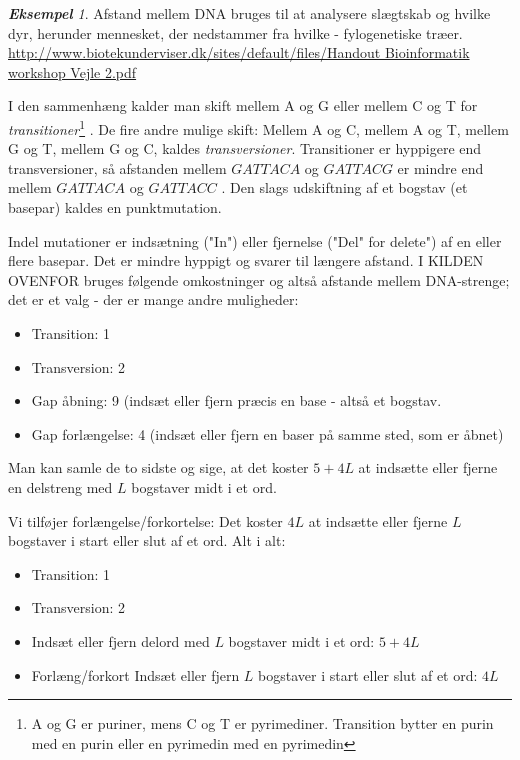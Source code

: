 \documentclass[a4paper, 12pt]{article}
\theoremstyle{remark}
\newtheorem{Eksempel}{\textbf{Eksempel}}
\begin{document}
\begin{Eksempel}
Afstand mellem DNA bruges til at analysere slægtskab og hvilke dyr, herunder mennesket, der nedstammer fra hvilke - fylogenetiske træer.\\ \url{ http://www.biotekunderviser.dk/sites/default/files/Handout Bioinformatik workshop Vejle 2.pdf}

I den sammenhæng kalder man skift mellem A og G eller mellem C og T for \emph{transitioner}\footnote{A og G er puriner, mens C og T er pyrimediner. Transition bytter en purin med en purin eller en pyrimedin med en pyrimedin} . De fire andre mulige skift: Mellem A og C, mellem A og T, mellem G og T, mellem G og C, kaldes \emph{transversioner}. Transitioner er hyppigere end transversioner, så afstanden mellem $GATTACA$ og $GATTACG$ er mindre end mellem $GATTACA$ og $GATTACC$ . Den slags udskiftning af et bogstav (et basepar) kaldes en punktmutation.

Indel mutationer er indsætning ("In") eller fjernelse ("Del" for delete") af en eller flere basepar. Det er mindre hyppigt og svarer til længere afstand. I  KILDEN OVENFOR bruges følgende omkostninger og altså afstande mellem DNA-strenge; det er et valg - der er mange andre muligheder: 
\begin{itemize}
\item Transition: 1
\item Transversion: 2
\item Gap åbning: 9 (indsæt eller fjern præcis en base - altså et bogstav.
\item Gap forlængelse: 4 (indsæt eller fjern en baser på samme sted, som er åbnet)
\end{itemize}
Man kan samle de to sidste og sige, at det koster $5+4L$ at indsætte eller fjerne en delstreng med $L$ bogstaver midt i et ord. 

Vi tilføjer forlængelse/forkortelse: Det koster $4L$ at indsætte eller fjerne $L$ bogstaver i start eller slut af et ord. Alt i alt:
\begin{itemize}
\item Transition: 1
\item Transversion: 2
\item Indsæt eller fjern delord med $L$ bogstaver midt i et ord: $5+4L$
\item Forlæng/forkort Indsæt eller fjern $L$ bogstaver i start eller slut af et ord: $4L$
\end{itemize}
\end{Eksempel}
\end{document}
